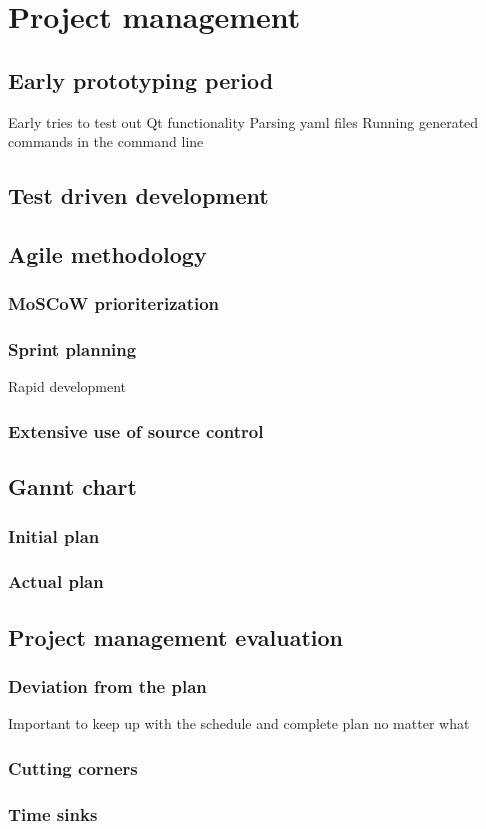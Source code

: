 \section{Project management} \label{project-man}

\subsection{Early prototyping period}
Early tries to test out Qt functionality
Parsing yaml files
Running generated commands in the command line

\subsection{Test driven development}

\subsection{Agile methodology}

	\subsubsection{MoSCoW prioriterization}
	
	\subsubsection{Sprint planning}
	Rapid development
	
	\subsubsection{Extensive use of source control}
	
\subsection{Gannt chart}

	\subsubsection{Initial plan}
	
	\subsubsection{Actual plan}	
	
\subsection{Project management evaluation}
	
	\subsubsection{Deviation from the plan}
	Important to keep up with the schedule and complete plan no matter what
	
	\subsubsection{Cutting corners}
	
	\subsubsection{Time sinks}
	
